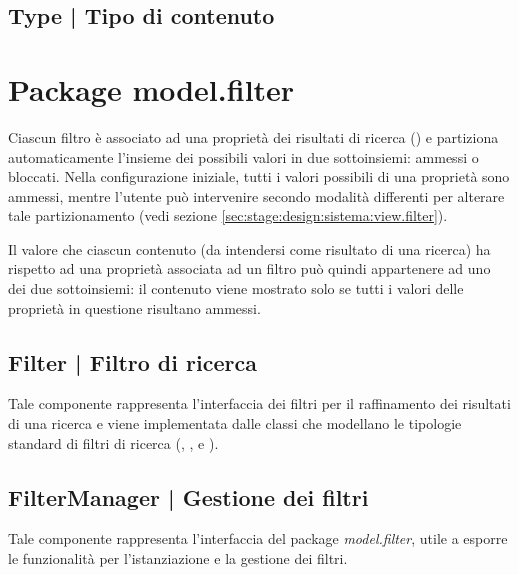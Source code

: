 \documentclass[10pt,a4paper,headinclude,footinclude,hidelinks]{scrreprt} %
\begin{document}
	\subsection[Type]{Type | Tipo di contenuto}
	\label{sec:stage:design:sistema:model.criteria:type}

	\section{Package model.filter}
	\label{sec:stage:design:sistema:model.filter}
	Ciascun filtro è associato ad una proprietà dei risultati di ricerca (\textit{}) e partiziona automaticamente l'insieme dei possibili valori in due sottoinsiemi: ammessi o bloccati. Nella configurazione iniziale, tutti i valori possibili di una proprietà sono ammessi, mentre l'utente può intervenire secondo modalità differenti per alterare tale partizionamento (vedi sezione \ref{sec:stage:design:sistema:view.filter}).
	
	Il valore che ciascun contenuto (da intendersi come risultato di una ricerca) ha rispetto ad una proprietà associata ad un filtro può quindi appartenere ad uno dei due sottoinsiemi: il contenuto viene mostrato solo se tutti i valori delle proprietà in questione risultano ammessi.

	\subsection[Filter]{Filter | Filtro di ricerca}
	\label{sec:stage:design:sistema:model.filter:filter}
	Tale componente rappresenta l'interfaccia dei filtri per il raffinamento dei risultati di una ricerca e viene implementata dalle classi che modellano le tipologie standard di filtri di ricerca (\textit{}, \textit{}, \textit{} e \textit{}).
	
	\subsection[FilterManager]{FilterManager | Gestione dei filtri}
	\label{sec:stage:design:sistema:model.filter:filter-manager}
	Tale componente rappresenta l'interfaccia del package \textit{model.filter}, utile a esporre le funzionalità per l'istanziazione e la gestione dei filtri.
\end{document}
